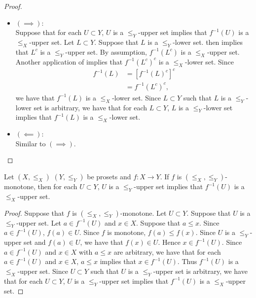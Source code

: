 \documentclass{book}
\begin{document}
	\begin{proof}\
		\begin{itemize}
			\item $(\implies)$: \\
			Suppose that for each $U \subset Y$, $U$ is a $\leq_Y$-upper set implies that $f^{-1}(U)$ is a $\leq_X$-upper set. Let $L \subset Y$. Suppose that $L$ is a $\leq_Y$-lower set.  then implies that $L^c$ is a $\leq_Y$-upper set. By assumption, $f^{-1}(L^c)$ is a $\leq_X$-upper set. Another application of  implies that $f^{-1}(L^c)^c$ is a $\leq_X$-lower set. Since
			\begin{align*}
				f^{-1}(L)
				& = [f^{-1}(L)^c]^c \\
				& = f^{-1}(L^c)^c,
			\end{align*}
			we have that $f^{-1}(L)$ is a $\leq_X$-lower set. Since $L \subset Y$ such that $L$ is a $\leq_Y$-lower set is arbitrary, we have that for each $L \subset Y$, $L$ is a $\leq_Y$-lower set implies that $f^{-1}(L)$ is a $\leq_X$-lower set. 
			\item $(\impliedby)$: \\
			Similar to $(\implies)$.
		\end{itemize}
	\end{proof}
	
	\begin{ex} 
		Let $(X, \leq_X)$ $(Y, \leq_Y)$ be prosets and $f:X \rightarrow Y$. If $f$ is $(\leq_X, \leq_Y)$-monotone, then for each $U \subset Y$, $U$ is a $\leq_Y$-upper set implies that $f^{-1}(U)$ is a $\leq_X$-upper set.
	\end{ex}
	
	\begin{proof}
		Suppose that $f$ is $(\leq_X, \leq_Y)$-monotone. Let $U \subset Y$. Suppose that $U$ is a $\leq_Y$-upper set. Let $a \in f^{-1}(U)$ and $x \in X$. Suppose that $a \leq x$. Since $a \in f^{-1}(U)$, $f(a) \in U$. Since $f$ is monotone, $f(a) \leq f(x)$. Since $U$ is a $\leq_Y$-upper set and $f(a) \in U$, we have that $f(x) \in U$. Hence $x \in f^{-1}(U)$. Since $a \in f^{-1}(U)$ and $x \in X$ with $a \leq x$ are arbitrary, we have that for each $a \in f^{-1}(U)$ and $x \in X$, $a \leq x$ implies that $x \in f^{-1}(U)$. Thus $f^{-1}(U)$ is a $\leq_X$-upper set. Since $U \subset Y$ such that $U$ is a $\leq_Y$-upper set is arbitrary, we have that for each $U \subset Y$, $U$ is a $\leq_Y$-upper set implies that $f^{-1}(U)$ is a $\leq_X$-upper set.
	\end{proof}
	
\end{document}
